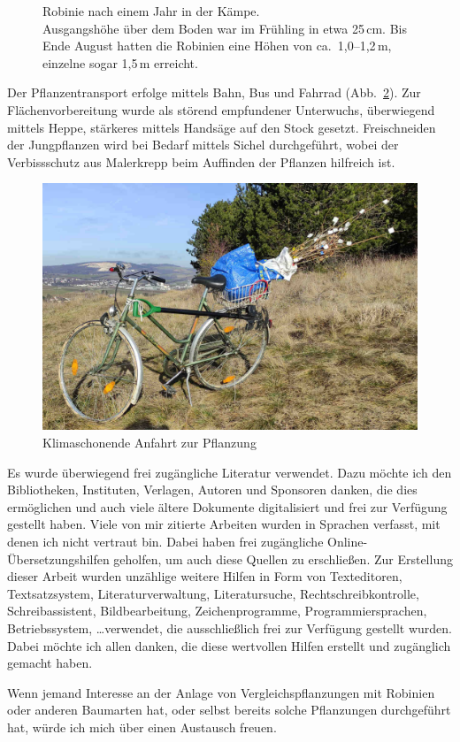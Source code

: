 \documentclass[twocolumn]{scrartcl}
\begin{document}
\begin{figure}[htbp]
  \caption{Robinie nach einem Jahr in der Kämpe.\\
  Ausgangshöhe über dem Boden war im Frühling in etwa 25\,cm.
  Bis Ende August hatten die
  Robinien eine Höhen von ca.\ 1,0--1,2\,m, einzelne sogar 1,5\,m erreicht.}
  \label{fig:robinieEinJahr}
\end{figure}

Der Pflanzentransport
erfolge mittels Bahn, Bus und Fahrrad
(Abb.~\ref{fig:fahrradPflanzung}). Zur Flächenvorbereitung wurde als
störend empfundener Unterwuchs, überwiegend mittels Heppe, stärkeres
mittels Handsäge auf den Stock gesetzt. Freischneiden der Jungpflanzen
wird bei Bedarf mittels Sichel durchgeführt, wobei der Verbissschutz
aus Malerkrepp beim Auffinden der Pflanzen hilfreich ist.

\begin{figure}[htbp]
  \centering
  \includegraphics[width=.9\linewidth]{./bild/fahrradPflanzung}
  \caption{Klimaschonende Anfahrt zur Pflanzung}
  \label{fig:fahrradPflanzung}
\end{figure}

Es wurde überwiegend frei zugängliche Literatur verwendet. Dazu möchte ich den
Bibliotheken, Instituten, Verlagen, Autoren und Sponsoren danken, die dies
ermöglichen und auch viele ältere Dokumente digitalisiert und frei zur Verfügung
gestellt haben. Viele von mir zitierte Arbeiten wurden in Sprachen verfasst, mit
denen ich nicht vertraut bin. Dabei haben frei zugängliche
Online-Übersetzungshilfen geholfen, um auch diese Quellen zu erschließen. Zur
Erstellung dieser Arbeit wurden unzählige weitere Hilfen in Form von
Texteditoren, Textsatzsystem, Literaturverwaltung, Literatursuche,
Rechtschreibkontrolle, Schreibassistent, Bildbearbeitung, Zeichenprogramme,
Programmiersprachen, Betriebssystem, \dots verwendet, die ausschließlich frei
zur Verfügung gestellt wurden. Dabei möchte ich allen danken, die diese
wertvollen Hilfen erstellt und zugänglich gemacht haben.

Wenn jemand Interesse an der Anlage von Vergleichspflanzungen mit Robinien oder anderen Baumarten hat, oder selbst bereits solche Pflanzungen durchgeführt hat, würde ich mich über einen Austausch freuen.


%
\printbibliography

\end{document}

